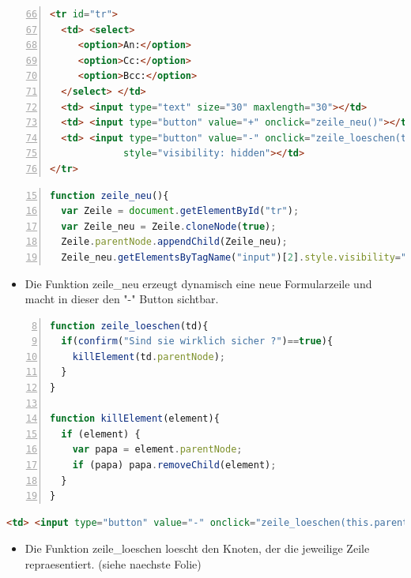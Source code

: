 \begin{frame}[<+->][fragile]
\tiny{ \begin{lstlisting}[language = HTML,
                                   mathescape = true, 
                   breaklines=true, 
                   numbers = left,
	        firstnumber=66 , 
                   numbersep = 3pt]
<tr id="tr">
  <td> <select>
     <option>An:</option>
     <option>Cc:</option>
     <option>Bcc:</option>
  </select> </td>
  <td> <input type="text" size="30" maxlength="30"></td>
  <td> <input type="button" value="+" onclick="zeile_neu()"></td>
  <td> <input type="button" value="-" onclick="zeile_loeschen(this.parentNode)" 
             style="visibility: hidden"></td>
</tr>
\end{lstlisting}}
\tiny{ \begin{lstlisting}[language=JavaScript, 
		   numbers=left,
		   numbersep=3pt,
		   firstnumber= 15,
		   breaklines=true]
function zeile_neu(){
  var Zeile = document.getElementById("tr");
  var Zeile_neu = Zeile.cloneNode(true);
  Zeile.parentNode.appendChild(Zeile_neu);
  Zeile_neu.getElementsByTagName("input")[2].style.visibility="visible";}
\end{lstlisting}}
\normalsize{
\begin{itemize}
\item Die Funktion zeile\_neu erzeugt dynamisch eine neue Formularzeile und macht in dieser den "-" Button sichtbar.
\end{itemize}
}
\end{frame}
\begin{frame}[<+->][fragile]
\tiny{ \begin{lstlisting}[language=JavaScript, 
		   numbers=left,
		   numbersep=3pt,
		   firstnumber= 8,
		   breaklines=true]
function zeile_loeschen(td){
  if(confirm("Sind sie wirklich sicher ?")==true){
    killElement(td.parentNode);
  }
}

function killElement(element){
  if (element) {
    var papa = element.parentNode;
    if (papa) papa.removeChild(element);
  }
}

\end{lstlisting}}
\tiny{ \begin{lstlisting}[language = HTML,
                                   mathescape = true, 
                   breaklines=true,  
                   numbersep = 3pt]
<td> <input type="button" value="-" onclick="zeile_loeschen(this.parentNode)" style="visibility:visible"> </td>
\end{lstlisting}}
\normalsize
\begin{itemize}
\item Die Funktion zeile\_loeschen loescht den Knoten, der die jeweilige Zeile repraesentiert. (siehe naechste Folie) 
\end{itemize}
\end{frame}

